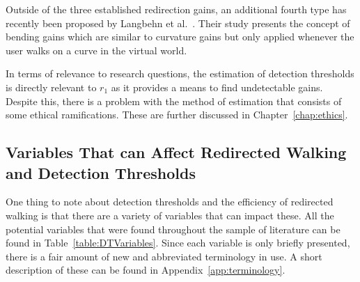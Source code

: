 Outside of the three established redirection gains, an additional fourth type has recently been proposed by Langbehn et al.~\cite{7833190}. Their study presents the concept of bending gains which are similar to curvature gains but only applied whenever the user walks on a curve in the virtual world. 

In terms of relevance to research questions, the estimation of detection thresholds is directly relevant to $r_1$ as it provides a means to find undetectable gains. Despite this, there is a problem with the method of estimation that consists of some ethical ramifications. These are further discussed in Chapter~\ref{chap:ethics}.

\subsection{Variables That can Affect Redirected Walking and Detection Thresholds}
One thing to note about detection thresholds and the efficiency of redirected walking is that there are a variety of variables that can impact these. All the potential variables that were found throughout the sample of literature can be found in Table~\ref{table:DTVariables}. Since each variable is only briefly presented, there is a fair amount of new and abbreviated terminology in use. A short description of these can be found in Appendix~\ref{app:terminology}.

